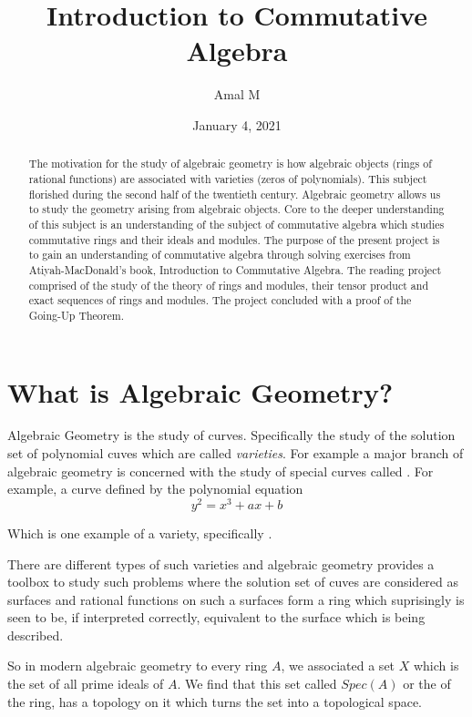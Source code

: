 \documentclass[]{report}
\begin{document}
\title{Introduction to Commutative Algebra}
\author{Amal M}
\date{January 4, 2021}
\maketitle

\begin{abstract}
    The motivation for the study of algebraic geometry is how algebraic objects (rings of rational functions) are associated with varieties (zeros of polynomials). This subject florished during the second half of the twentieth century. Algebraic geometry allows us to study the geometry arising from algebraic objects. Core to the deeper understanding of this subject is an understanding of the subject of commutative algebra which studies commutative rings and their ideals and modules. The purpose of the present project is to gain an understanding of commutative algebra through solving exercises from Atiyah-MacDonald's book, Introduction to Commutative Algebra. The reading project comprised of the study of the theory of rings and modules, their tensor product and exact sequences of rings and modules. The project concluded with a proof of the Going-Up Theorem.

\end{abstract}

\chapter{What is Algebraic Geometry?}

Algebraic Geometry is the study of curves. Specifically the study of the solution set of polynomial cuves which are called \textit{varieties}. For example a major branch of algebraic geometry is concerned with the study of special curves called . For example, a curve defined by the polynomial equation
    $$y^2 = x^3+ ax + b$$

Which is one example of a variety, specifically . 

There are different types of such varieties and algebraic geometry provides a toolbox to study such problems where the solution set of cuves are considered as surfaces and rational functions on such a surfaces form a ring which suprisingly is seen to be, if interpreted correctly, equivalent to the surface which is being described. 

So in modern algebraic geometry to every ring $A$, we associated a set $X$ which is the set of all prime ideals of $A$. We find that this set called $Spec(A)$ or the  of the ring, has a topology on it which turns the set into a topological space. 
\end{document}
